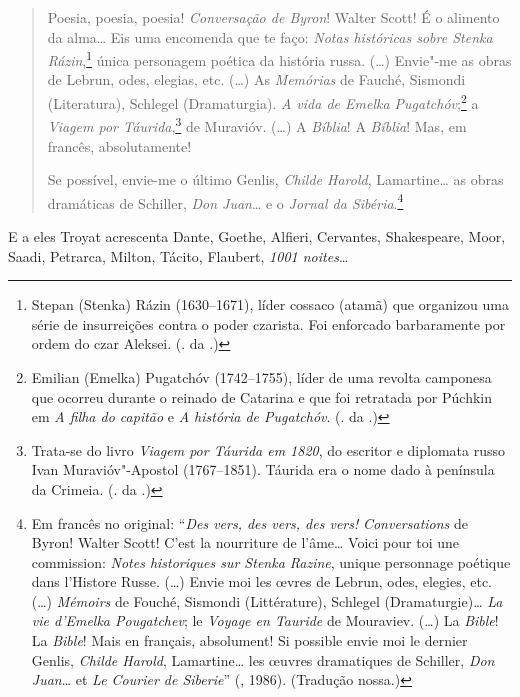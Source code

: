 \begin{quotation}
Poesia, poesia, poesia! \emph{Conversação de Byron}! Walter Scott! É o alimento da alma\ldots{} Eis uma encomenda que te faço: \emph{Notas históricas sobre Stenka Rázin},\footnote{Stepan (Stenka) Rázin (1630--1671), líder cossaco (atamã) que organizou uma série de insurreições contra o poder czarista. Foi enforcado barbaramente por ordem do czar Aleksei. (. da .)} única personagem poética da história russa. (\ldots{}) Envie"-me as obras de Lebrun, odes, elegias, etc. (\ldots{}) As \emph{Memórias} de Fauché, Sismondi (Literatura), Schlegel (Dramaturgia). \emph{A vida de Emelka Pugatchóv};\footnote{Emilian (Emelka) Pugatchóv (1742--1755), líder de uma revolta camponesa que ocorreu durante o reinado de Catarina  e que foi retratada por Púchkin em \emph{A filha do capitão} e \emph{A história de Pugatchóv}. (. da .)} a \emph{Viagem por Táurida},\footnote{Trata-se do livro \emph{Viagem por Táurida em 1820}, do escritor e diplomata russo Ivan Muravióv"-Apostol (1767--1851). Táurida era o nome dado à península da Crimeia. (. da .)} de Muravióv. (\ldots{}) A \emph{Bíblia}! A \emph{Bíblia}! Mas, em francês, absolutamente!

Se possível, envie-me o último Genlis, \emph{Childe Harold}, Lamartine\ldots{} as obras dramáticas de Schiller, \emph{Don Juan}\ldots{} e o \emph{Jornal da Sibéria}.\footnote{Em francês no original: ``\emph{Des vers, des vers, des vers!} \emph{Conversations} de Byron! Walter Scott! C'est la nourriture de l'âme\ldots{} Voici pour toi une commission: \emph{Notes historiques sur Stenka Razine}, unique personnage poétique dans l'Histore Russe. (\ldots{}) Envie moi les œvres de Lebrun, odes, elegies, etc. (\ldots{}) \emph{Mémoirs} de Fouché, Sismondi (Littérature), Schlegel (Dramaturgie)\ldots{} \emph{La vie d'Emelka Pougatchev}; le \emph{Voyage en Tauride} de Mouraviev. (\ldots{}) La \emph{Bible}! La \emph{Bible}! Mais en français, absolument! Si possible envie moi le dernier Genlis, \emph{Childe Harold}, Lamartine\ldots{} les œuvres dramatiques de Schiller, \emph{Don Juan}\ldots{} et \emph{Le Courier de Siberie}'' (, 1986). (Tradução nossa.)}
\end{quotation}

E a eles Troyat acrescenta Dante, Goethe, Alfieri, Cervantes,
Shakespeare, Moor, Saadi, Petrarca, Milton, Tácito, Flaubert, \emph{1001 noites}\ldots{}

